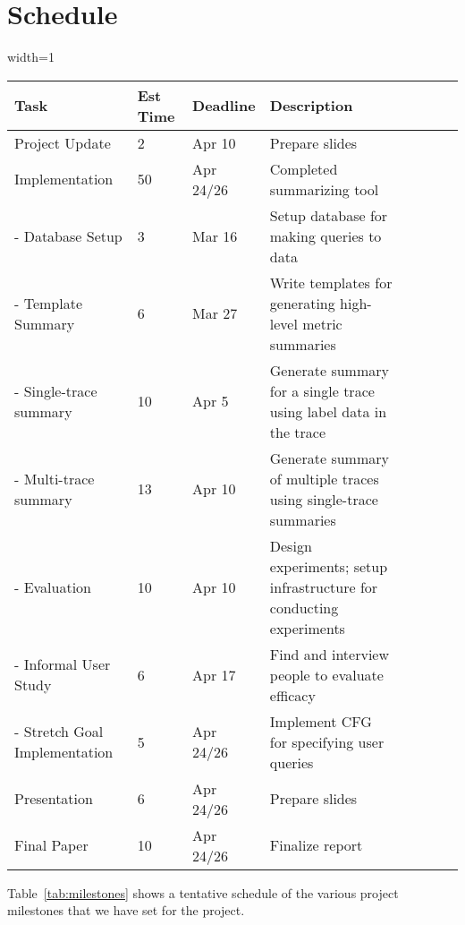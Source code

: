 \section{Schedule}

\begin{table*}[t]
    \centering
\begin{adjustbox}{width=1\textwidth}
    \begin{tabular}{l*{6}{l}r}
        \textbf{Task}              & \textbf{Est Time} & \textbf{Deadline} & \textbf{Description} \\
        \hline
        Project Update & 2 & Apr 10 & Prepare slides\\
        Implementation & 50 & Apr 24/26 & Completed summarizing tool\\
        - Database Setup & 3 & Mar 16 & Setup database for making queries to data\\
        - Template Summary & 6 & Mar 27 & Write templates for generating high-level metric summaries\\
        - Single-trace summary & 10 & Apr 5 & Generate summary for a single trace using label data in the trace\\
        - Multi-trace summary & 13 & Apr 10 & Generate summary of multiple traces using single-trace summaries\\
        - Evaluation & 10 & Apr 10 & Design experiments; setup infrastructure for conducting experiments\\
        - Informal User Study & 6 & Apr 17 & Find and interview people to evaluate efficacy\\
        - Stretch Goal Implementation & 5 & Apr 24/26 & Implement CFG for specifying user queries\\
        Presentation & 6 & Apr 24/26 & Prepare slides\\
        Final Paper & 10 & Apr 24/26 & Finalize report\\
        \end{tabular}
\end{adjustbox}
\caption{Project milestones. Estimated time reported in hours}
\label{tab:milestones}
\end{table*}

Table~\ref{tab:milestones} shows a tentative schedule of the various project milestones that we have set
for the project.